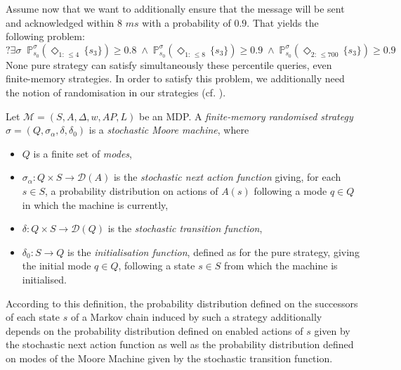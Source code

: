 \begin{example}
Assume now that we want to additionally ensure that the message will be sent and acknowledged within $8$ $ms$ with a probability of $0.9$.
That yields the following \SSPPQ{} problem:
\[
  ?\exists \sigma \;\; \mathbb{P}^{\sigma}_{s_0}(\Diamond_{1: \, \leq 4} \, \{s_3\}) \geq 0.8 \; \wedge \;
   \mathbb{P}^{\sigma}_{s_0}(\Diamond_{1: \, \leq 8} \, \{s_3\}) \geq 0.9 \; \wedge \;
  \mathbb{P}_{s_0}^{\sigma}(\Diamond_{2: \, \leq 700} \, \{s_3\}) \geq 0.9
\]
None pure strategy can satisfy simultaneously these percentile queries, even finite-memory strategies.
In order to satisfy this \SSPPQ{} problem, we additionally need the notion of randomisation in our strategies (cf. ).
\end{example}

\begin{definition}
  Let \sloppy $\mathcal{M}={(S, A, \Delta, w, AP, L)}$ be an MDP. A \textit{finite-memory randomised strategy} $\sigma = (Q, \sigma_\alpha, \delta, \delta_0)$ is a \textit{stochastic Moore machine}, where
  \begin{itemize}
    \item $Q$ is a finite set of \textit{modes},
    \item $\sigma_\alpha: Q \times S \rightarrow \mathcal{D}(A)$ is the \textit{stochastic next action function} giving, for each $s \in S$, a probability distribution on actions of $A(s)$ following a mode $q \in Q$ in which the machine is currently,
    \item $\delta: Q \times S \rightarrow \mathcal{D}(Q)$ is the \textit{stochastic transition function},
    \item $\delta_0: S \rightarrow Q$ is the \textit{initialisation function}, defined as for the pure strategy, giving the initial mode $q \in Q$, following a state $s \in S$ from which the machine is initialised.
  \end{itemize}
\end{definition}

According to this definition, the probability distribution defined on the successors of each state $s$ of a Markov chain induced by such a strategy additionally depends on the probability distribution defined on enabled actions of $s$ given by the stochastic next action function as well as the probability distribution defined on modes of the Moore Machine given by the stochastic transition function.

